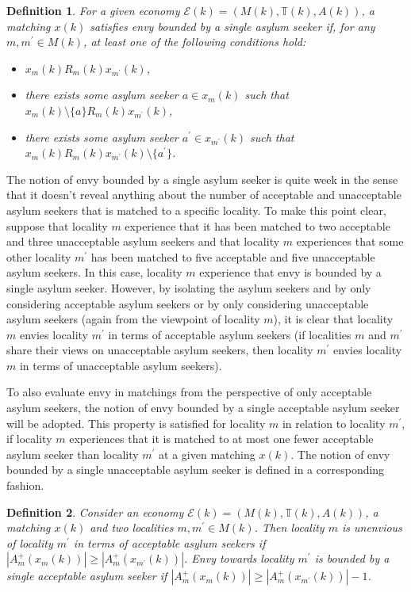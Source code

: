 \documentclass[12pt,fleqn]{article}
\newtheorem{definition}{Definition}
\begin{document}
\begin{definition}\rm\label{DEF:1-Utility_DIFF}
For a given economy $\mathcal{E}(k)=(M(k),\mathbb{T}(k),A(k))$, a matching $x(k)$ satisfies envy bounded by a single asylum seeker if, for any $m,m^\prime\in M(k)$, at least one of the following conditions hold:
\begin{itemize}
\item[(i)] $x_m(k)R_m(k) x_{m^\prime}(k)$,
\item[(ii)] there exists some asylum seeker $a\in x_{m}(k)$ such that $x_m(k)\setminus\{a\}R_m(k) x_{m^\prime}(k)$,
\item[(iii)] there exists some asylum seeker $a^\prime\in x_{m^\prime}(k)$ such that $x_m(k)R_m(k) x_{m^\prime}(k)\setminus\{a^\prime\}$.
\end{itemize}
\end{definition}
\noindent The notion of envy bounded by a single asylum seeker is quite week in the sense that it doesn't reveal anything about the number of acceptable and unacceptable asylum seekers that is matched to a specific locality. To make this point clear, suppose that locality $m$ experience that it has been matched to two acceptable and three unacceptable asylum seekers and that locality $m$ experiences that some other locality $m^\prime$ has been matched to five acceptable and five unacceptable asylum seekers. In this case, locality $m$ experience that envy is bounded by a single asylum seeker. However, by isolating the asylum seekers and by only considering acceptable asylum seekers or by only considering unacceptable asylum seekers (again from the viewpoint of locality $m$), it is clear that locality $m$ envies locality $m^\prime$ in terms of acceptable asylum seekers (if localities $m$ and $m^\prime$ share their views on unacceptable asylum seekers, then locality $m^\prime$ envies locality $m$ in terms of unacceptable asylum seekers).

To also evaluate envy in matchings from the perspective of only acceptable asylum seekers, the notion of envy bounded by a single acceptable asylum seeker will be adopted. This property is satisfied for locality $m$ in relation to locality $m^\prime$, if locality $m$ experiences that it is matched to at most one fewer acceptable asylum seeker than locality $m^\prime$ at a given matching $x(k)$. The notion of envy bounded by a single unacceptable asylum seeker is defined in a corresponding fashion.

\begin{definition}\rm\label{DEF:1-Envy_ACC}
Consider an economy $\mathcal{E}(k)=(M(k),\mathbb{T}(k),A(k))$, a matching $x(k)$ and two localities $m,m^\prime\in M(k)$. Then locality $m$ is unenvious of locality $m^\prime$ in terms of acceptable asylum seekers if $|A_m^+(x_m(k))|\geq |A_m^+(x_{m^\prime}(k))|$. Envy towards locality $m^\prime$ is bounded by a single acceptable asylum seeker if $|A_m^+(x_m(k))|\geq |A_m^+(x_{m^\prime}(k))|-1$.
\end{definition}
\end{document}
